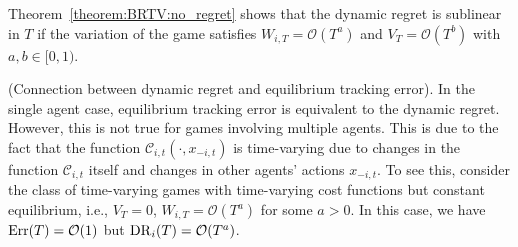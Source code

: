 Theorem~\ref{theorem:BRTV:no_regret} shows that the dynamic regret is sublinear in $T$ if the variation of the game satisfies $W_{i,T}=\mathcal{O}(T^a)$ and $V_{T}=\mathcal{O}(T^b)$ with $a,b\in[0,1)$. 
%
\begin{remark}
(Connection between dynamic regret and equilibrium tracking error). In the single agent case, equilibrium tracking error is equivalent to the dynamic regret. However, this is not true for games involving multiple agents. This is due to the fact that the function $\mathcal{C}_{i,t}(\cdot,x_{-i,t})$ is time-varying due to changes in the function $\mathcal{C}_{i,t}$ itself and changes in other agents' actions $x_{-i,t}$.
To see this, consider the class of time-varying games with time-varying cost functions but constant equilibrium, i.e., $V_T=0$, $W_{i,T}=\mathcal{O}(T^a)$ for some $a>0$. In this case, we have $ {\rm{Err}}(T) = \mathcal{O}(1)$ but  ${\rm{DR}}_i(T) = \mathcal{O}(T^a)$.
\end{remark}
